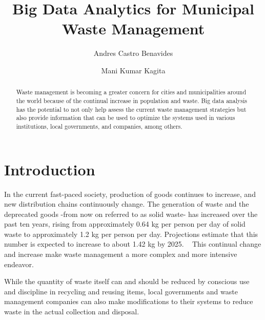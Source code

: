 \documentclass[sigconf]{acmart}
\begin{document}
\title{Big Data Analytics for Municipal Waste Management}

\author{Andres Castro Benavides}

\author{Mani Kumar Kagita}
\renewcommand{\shortauthors}{A. Castro et al.}

\begin{abstract}
Waste management is becoming a greater concern for cities and municipalities around the world because of the continual increase in population and waste. Big data analysis has the potential to not only help assess the current waste management strategies but also provide information that can be used to optimize the systems used in various institutions, local governments, and companies, among others.
\end{abstract}


\maketitle

\section{Introduction}

In the current fast-paced society,  production of goods continues to increase, and new distribution chains continuously change. The generation of waste and the deprecated goods -from now on referred to as solid waste- has increased over the past ten years, rising from approximately 0.64 kg per person per day of solid waste to approximately 1.2 kg per person per day.  Projections estimate that this number is expected to increase to about 1.42 kg by 2025.
~\cite{hoornweg2012} This continual change and increase make waste management a more complex and more intensive endeavor.  

While the quantity of waste itself can and should be reduced by conscious use and discipline in recycling and reusing items, local governments and waste management companies can also make modifications to their systems to reduce waste in the actual collection and disposal.
\end{document}
